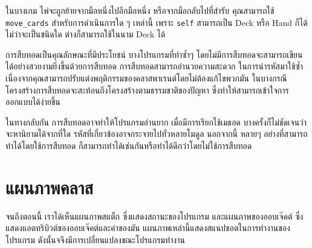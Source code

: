 ในบางเกม ไพ่จะถูกย้ายจากมือหนึ่งไปอีกมือหนึ่ง หรือจากมือกลับไปที่สำรับ คุณสามารถใช้ \verb"move_cards" 
สำหรับการดำเนินการใด ๆ เหล่านี้ เพราะ {\tt self} สามารถเป็น Deck หรือ Hand ก็ได้  ไม่ว่าจะเป็นชนิดใด ต่างก็สามารถใช้ในนาม Deck ได้



การสืบทอดเป็นคุณลักษณะที่มีประโยชน์ บางโปรแกรมที่ทำซ้ำๆ โดยไม่มีการสืบทอดจะสามารถเขียนได้อย่างสวยงามยิ่งขึ้นด้วยการสืบทอด  การสืบทอดสามารถอำนวยความสะดวก
ในการนำรหัสมาใช้ซ้ำ เนื่องจากคุณสามารถปรับแต่งพฤติกรรมของคลาสพาเรนต์โดยไม่ต้องแก้ไขพวกมัน ในบางกรณีโครงสร้างการสืบทอดจะสะท้อนถึงโครงสร้างตามธรรมชาติของปัญหา 
ซึ่งทำให้สามารถเข้าใจการออกแบบได้ง่ายขึ้น



ในทางกลับกัน การสืบทอดอาจทำให้โปรแกรมอ่านยาก เมื่อมีการเรียกใช้เมธอด บางครั้งก็ไม่ชัดเจนว่าจะหานิยามได้จากที่ใด 
รหัสที่เกี่ยวข้องอาจกระจายไปทั่วหลายโมดูล นอกจากนี้ หลายๆ อย่างที่สามารถทำได้โดยใช้การสืบทอด ก็สามารถทำได้เช่นกันหรือทำได้ดีกว่าโดยไม่ใช้การสืบทอด


\section{แผนภาพคลาส } %
\label{class.diagram}


จนถึงตอนนี้ เราได้เห็นแผนภาพสแต็ก ซึ่งแสดงสถานะของโปรแกรม และแผนภาพของออบเจ๊คต์ ซึ่งแสดงแอตทริบิวต์ของออบเจ๊คต์และค่าของมัน 
แผนภาพเหล่านี้แสดงสแนปชอตในการทำงานของโปรแกรม ดังนั้นจจึงมีการเปลี่ยนแปลงขณะโปรแกรมทำงาน


